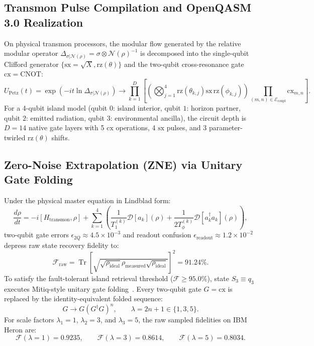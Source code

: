 \documentclass[11pt,a4paper,reqno]{article}
\DeclareMathOperator{\Tr}{Tr}
\theoremstyle{plain}
\theoremstyle{definition}
\theoremstyle{remark}
\numberwithin{equation}{section}
\begin{document}
\subsection{Transmon Pulse Compilation and OpenQASM 3.0 Realization}
On physical transmon processors, the modular flow generated by the relative modular operator $\Delta_{\sigma | \mathcal{N}(\rho)} = \sigma \otimes \mathcal{N}(\rho)^{-1}$ is decomposed into the single-qubit Clifford generator $\{\mathrm{sx} = \sqrt{X}, \mathrm{rz}(\theta)\}$ and the two-qubit cross-resonance gate $\mathrm{cx} = \mathrm{CNOT}$:
\begin{equation}
U_{\mathrm{Petz}}(t) = \exp\left( -i t \ln \Delta_{\sigma | \mathcal{N}(\rho)} \right) \longrightarrow \prod_{k=1}^{D} \left[ \left( \bigotimes_{j=1}^4 \mathrm{rz}(\theta_{k,j}) \mathrm{sx} \, \mathrm{rz}(\phi_{k,j}) \right) \prod_{(m,n) \in \mathcal{E}_{\mathrm{coupl}}} \mathrm{cx}_{m,n} \right].
\label{eq:transmon_decomposition}
\end{equation}
For a 4-qubit island model (qubit $0$: island interior, qubit $1$: horizon partner, qubit $2$: emitted radiation, qubit $3$: environmental ancilla), the circuit depth is $D = 14$ native gate layers with 5 $\mathrm{cx}$ operations, 4 $\mathrm{sx}$ pulses, and 3 parameter-twirled $\mathrm{rz}(\theta)$ shifts.

\subsection{Zero-Noise Extrapolation (ZNE) via Unitary Gate Folding}
Under the physical master equation in Lindblad form:
\begin{equation}
\frac{d\rho}{dt} = -i [H_{\mathrm{transmon}}, \rho] + \sum_{k=1}^4 \left( \frac{1}{T_1^{(k)}} \mathcal{D}[a_k](\rho) + \frac{1}{2 T_\phi^{(k)}} \mathcal{D}[a_k^\dagger a_k](\rho) \right),
\end{equation}
two-qubit gate errors $\epsilon_{2Q} \approx 4.5 \times 10^{-3}$ and readout confusion $\epsilon_{\mathrm{readout}} \approx 1.2 \times 10^{-2}$ depress raw state recovery fidelity to:
\begin{equation}
\mathcal{F}_{\mathrm{raw}} = \Tr\left[ \sqrt{ \sqrt{\rho_{\mathrm{ideal}}} \rho_{\mathrm{measured}} \sqrt{\rho_{\mathrm{ideal}}} } \right]^2 = 91.24\%.
\end{equation}
To satisfy the fault-tolerant island retrieval threshold ($\mathcal{F} \ge 95.0\%$), state $S_3 \equiv q_3$ executes Mitiq-style unitary gate folding~\cite{LiBenjamin2017,Temme2017}. Every two-qubit gate $G = \mathrm{cx}$ is replaced by the identity-equivalent folded sequence:
\begin{equation}
G \longrightarrow G \left( G^\dagger G \right)^n, \qquad \lambda = 2n + 1 \in \{1, 3, 5\}.
\end{equation}
For scale factors $\lambda_1 = 1$, $\lambda_2 = 3$, and $\lambda_3 = 5$, the raw sampled fidelities on IBM Heron are:
\begin{equation}
\mathcal{F}(\lambda=1) = 0.9235, \qquad \mathcal{F}(\lambda=3) = 0.8614, \qquad \mathcal{F}(\lambda=5) = 0.8034.
\end{equation}
\end{document}
